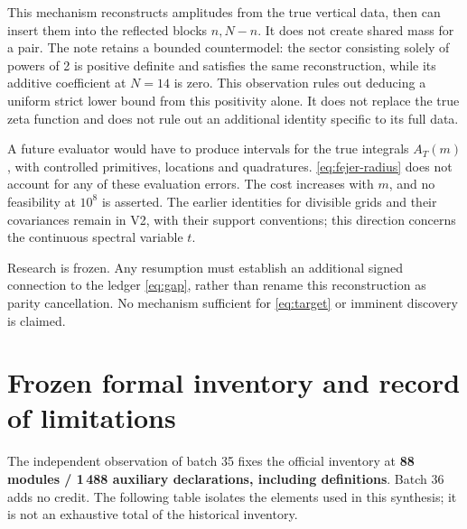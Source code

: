 \documentclass[11pt,a4paper]{article}
\theoremstyle{remark}
\begin{document}
This mechanism reconstructs amplitudes from the true vertical data,
then can insert them into the reflected blocks $n,N-n$. It does not create
shared mass for a pair. The note retains a bounded countermodel:
the sector consisting solely of powers of 2 is positive definite and satisfies the
same reconstruction, while its additive coefficient at $N=14$ is zero.
This observation rules out deducing a uniform strict lower bound from
this positivity alone. It does not replace the true zeta function and does not rule out an
additional identity specific to its full data.

A future evaluator would have to produce intervals for the true
integrals $A_T(m)$, with controlled primitives, locations and quadratures.
\eqref{eq:fejer-radius} does not account for any of these evaluation
errors. The cost increases with $m$, and no feasibility at $10^8$
is asserted. The earlier identities for divisible grids and their
covariances remain in V2, with their support conventions; this
direction concerns the continuous spectral variable $t$.

Research is frozen. Any resumption must establish an additional signed
connection to the ledger \eqref{eq:gap}, rather than rename this
reconstruction as parity cancellation. No mechanism sufficient
for \eqref{eq:target} or imminent discovery is claimed.

\clearpage
\section{Frozen formal inventory and record of limitations}\label{sec:inventory}
The independent observation of batch 35 fixes the official inventory at
\textbf{88 modules / 1\,488 auxiliary declarations, including definitions}.
Batch 36 adds no credit. The following table isolates the elements
used in this synthesis; it is not an exhaustive total of the
historical inventory.
\end{document}
